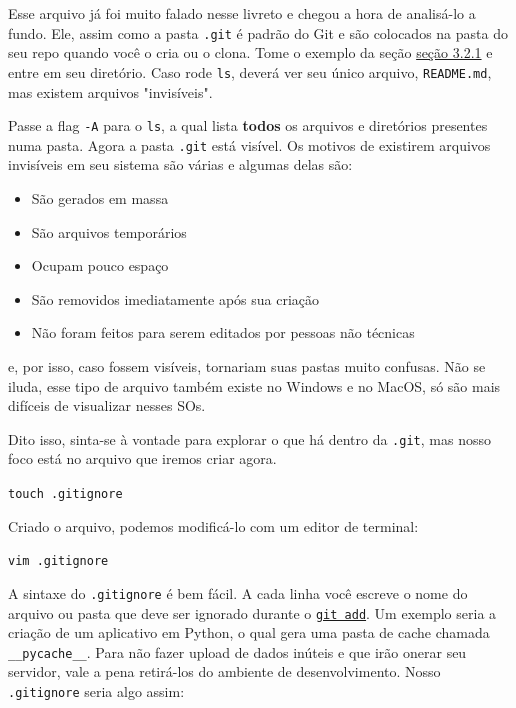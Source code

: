 \documentclass{article}
\begin{document}
  Esse arquivo já foi muito falado nesse livreto e chegou a hora de analisá-lo a fundo. Ele, assim como a pasta \texttt{.git} 
  é padrão do Git e são colocados na pasta do seu repo quando você o cria ou o clona. Tome o exemplo da 
  seção \href{sec:clone}{seção 3.2.1} e entre em seu diretório. Caso rode \texttt{ls}, deverá ver seu único arquivo, 
  \texttt{README.md}, mas existem arquivos "invisíveis". 
  
  Passe a flag \texttt{-A} para o \texttt{ls}, a qual lista \textbf{todos} os arquivos e diretórios presentes numa pasta. 
  Agora a pasta \texttt{.git} está visível. Os motivos de existirem arquivos invisíveis em seu sistema são várias e algumas delas são:
  
  \begin{itemize}
	\item{São gerados em massa}
	\item{São arquivos temporários}
	\item{Ocupam pouco espaço}
	\item{São removidos imediatamente após sua criação}
	\item{Não foram feitos para serem editados por pessoas não técnicas}
  \end{itemize}

  e, por isso, caso fossem visíveis, tornariam suas pastas muito confusas. Não se iluda, esse tipo de arquivo também existe no 
  Windows e no MacOS, só são mais difíceis de visualizar nesses SOs. 
  
  Dito isso, sinta-se à vontade para explorar o que há dentro da \texttt{.git}, mas nosso foco está no arquivo que iremos criar
  agora.

  \vspace{1ex}
  \texttt{touch .gitignore}
  \vspace{1ex}

  Criado o arquivo, podemos modificá-lo com um editor de terminal:  

  \vspace{1ex}
  \texttt{vim .gitignore}
  \vspace{1ex}

  A sintaxe do \texttt{.gitignore} é bem fácil. A cada linha você escreve o nome do arquivo ou pasta que deve 
  ser ignorado durante o \href{sec:add}{\texttt{git add}}. Um exemplo seria a criação de um aplicativo em 
  Python, o qual gera uma pasta de cache chamada \texttt{\_\_pycache\_\_}. Para não fazer upload de dados inúteis e que 
  irão onerar seu servidor, vale a pena retirá-los do ambiente de desenvolvimento. Nosso \texttt{.gitignore} seria algo assim: 
\end{document}
